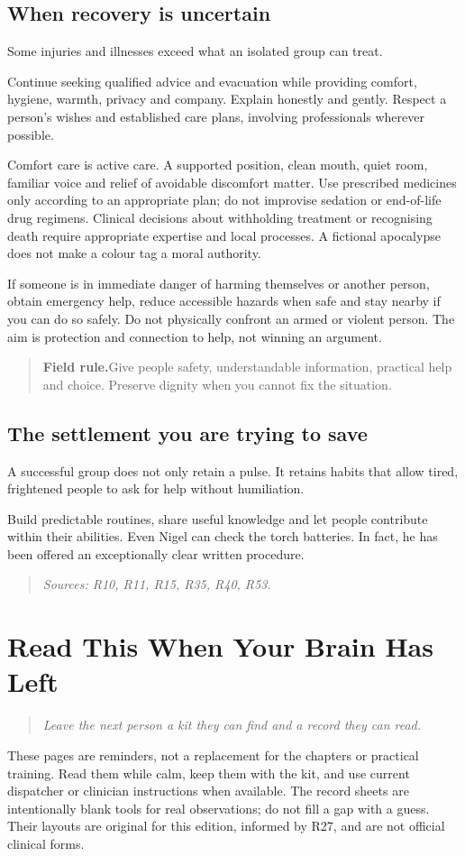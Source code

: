 \documentclass[10pt,openright]{book}
\newcommand{\fieldrule}[1]{\begin{quote}\textbf{Field rule.}\enspace #1\end{quote}}
\begin{document}
\section*{When recovery is uncertain}
Some injuries and illnesses exceed what an isolated group can treat.

Continue seeking qualified advice and evacuation while providing comfort, hygiene, warmth, privacy and company. Explain honestly and gently. Respect a person's wishes and established care plans, involving professionals wherever possible.

Comfort care is active care. A supported position, clean mouth, quiet room, familiar voice and relief of avoidable discomfort matter. Use prescribed medicines only according to an appropriate plan; do not improvise sedation or end-of-life drug regimens. Clinical decisions about withholding treatment or recognising death require appropriate expertise and local processes. A fictional apocalypse does not make a colour tag a moral authority.

If someone is in immediate danger of harming themselves or another person, obtain emergency help, reduce accessible hazards when safe and stay nearby if you can do so safely. Do not physically confront an armed or violent person. The aim is protection and connection to help, not winning an argument.

\fieldrule{Give people safety, understandable information, practical help and choice. Preserve dignity when you cannot fix the situation.}
\section*{The settlement you are trying to save}
A successful group does not only retain a pulse. It retains habits that allow tired, frightened people to ask for help without humiliation.

Build predictable routines, share useful knowledge and let people contribute within their abilities. Even Nigel can check the torch batteries. In fact, he has been offered an exceptionally clear written procedure.

\begin{quote}\emph{Sources: R10, R11, R15, R35, R40, R53.}\end{quote}
\chapter{Read This When Your Brain Has Left}
\begin{quote}\emph{Leave the next person a kit they can find and a record they can read.}\end{quote}
These pages are reminders, not a replacement for the chapters or practical training. Read them while calm, keep them with the kit, and use current dispatcher or clinician instructions when available. The record sheets are intentionally blank tools for real observations; do not fill a gap with a guess. Their layouts are original for this edition, informed by R27, and are not official clinical forms.
\end{document}
